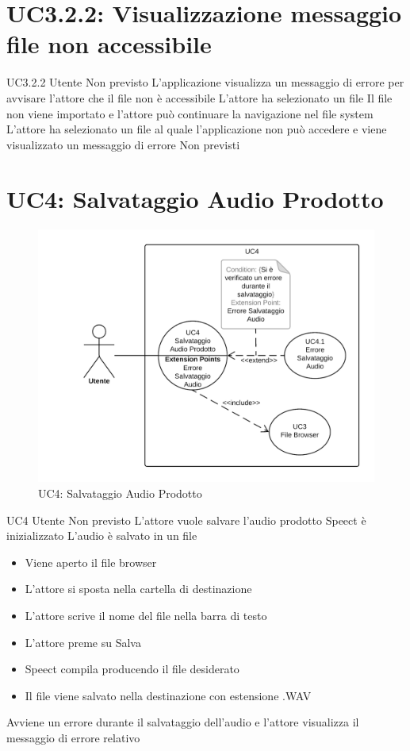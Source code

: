 \documentclass[../AnalisideiRequisiti.tex]{subfiles}
\begin{document}
\section{UC3.2.2: Visualizzazione messaggio file non accessibile}
\UserCase
{UC3.2.2}
{Utente}
{Non previsto}
{L'applicazione visualizza un messaggio di errore per avvisare l'attore che il file non è accessibile}
{L'attore ha selezionato un file }
{Il file non viene importato e l'attore può continuare la navigazione nel file system}
{L'attore ha selezionato un file al quale l'applicazione non può accedere e viene visualizzato un messaggio di errore}
{Non previsti}



\section{UC4: Salvataggio Audio Prodotto}
\begin{figure}[H]
	\centering
	\includegraphics[width=\textwidth]{../img/UC4.png}
	\caption{UC4: Salvataggio Audio Prodotto}
\end{figure}
\UserCase
{UC4}
{Utente}
{Non previsto}
{L'attore vuole salvare l'audio prodotto}
{Speect è inizializzato }
{L'audio è salvato in un file}
{
		\begin{itemize}
		\item{} Viene aperto il file browser 
		\item{} L'attore si sposta nella cartella di destinazione 
		\item{} L'attore scrive il nome del file nella barra di testo
		\item{} L'attore preme su Salva 
		\item{} Speect compila producendo il file desiderato
		\item{} Il file viene salvato nella destinazione con estensione .WAV
		\end{itemize}
}
{Avviene un errore durante il salvataggio dell'audio e l'attore visualizza il messaggio di errore relativo }
		
\end{document}
